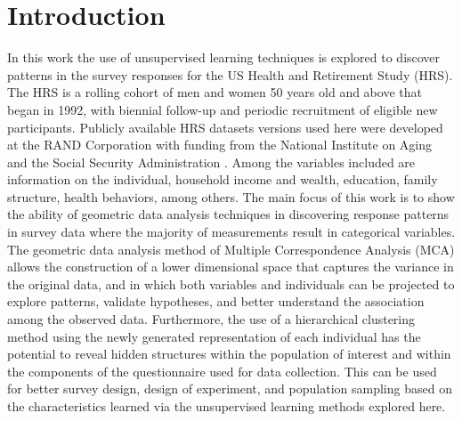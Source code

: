 \documentclass[conference,final,]{IEEEtran}
\begin{document}
\maketitle


%
\IEEEpeerreviewmaketitle


\hypertarget{introduction}{%
\section{Introduction}\label{introduction}}

In this work the use of unsupervised learning techniques is explored to
discover patterns in the survey responses for the US Health and
Retirement Study (HRS). The HRS is a rolling cohort of men and women 50
years old and above that began in 1992, with biennial follow-up and
periodic recruitment of eligible new participants. Publicly available
HRS datasets versions used here were developed at the RAND Corporation
with funding from the National Institute on Aging and the Social
Security Administration \cite{rand2008data}. Among the variables
included are information on the individual, household income and wealth,
education, family structure, health behaviors, among others. The main
focus of this work is to show the ability of geometric data analysis
techniques in discovering response patterns in survey data where the
majority of measurements result in categorical variables. The geometric
data analysis method of Multiple Correspondence Analysis (MCA) allows
the construction of a lower dimensional space that captures the variance
in the original data, and in which both variables and individuals can be
projected to explore patterns, validate hypotheses, and better
understand the association among the observed data. Furthermore, the use
of a hierarchical clustering method using the newly generated
representation of each individual has the potential to reveal hidden
structures within the population of interest and within the components
of the questionnaire used for data collection. This can be used for
better survey design, design of experiment, and population sampling
based on the characteristics learned via the unsupervised learning
methods explored here.
\end{document}
